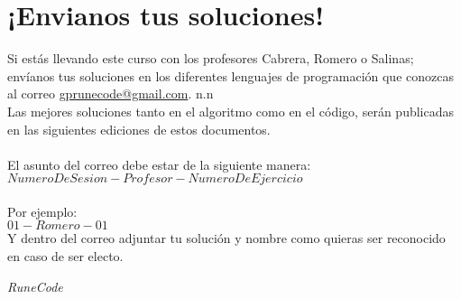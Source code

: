 \documentclass{article}
\begin{document}
\vspace{3cm} 
\section*{¡Envianos tus soluciones!}
Si estás llevando este curso con los profesores Cabrera, Romero o Salinas;
envíanos tus soluciones en los diferentes lenguajes de programación que
conozcas al correo \href{mailto:gprunecode@gmail.com}{gprunecode@gmail.com}.
n.n \\ 

Las mejores soluciones tanto en el algoritmo como en el código, serán
publicadas en las siguientes ediciones de estos documentos.\\ \\

El asunto del correo debe estar de la siguiente manera:\\
$NumeroDeSesion-Profesor-NumeroDeEjercicio$ \\ \\
Por ejemplo:  \\
$01-Romero-01$ \\

Y dentro del correo adjuntar tu solución y nombre como quieras ser reconocido en caso de ser electo.

\vspace{2cm}
\LARGE\textit{RuneCode}
\end{document}
